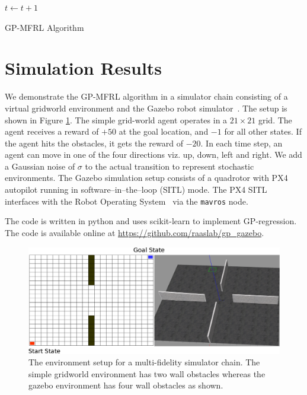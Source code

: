 \documentclass[12pt]{report}
\begin{document}
\begin{algorithm}
{{$t \leftarrow t + 	1$ \;



}}
\caption{GP-MFRL Algorithm}\label{GP-MFRL}
\end{algorithm}



\section{Simulation Results} \label{gp-mfrl-sim}
We demonstrate the GP-MFRL algorithm in a simulator chain consisting of a virtual gridworld environment and the Gazebo robot simulator~\cite{koenig2004design}. The setup is shown in Figure \ref{fig:gp_mfrl_setup}. The simple grid-world agent operates in a $21\times 21$ grid. The agent receives a reward of $+50$ at the goal location, and $-1$ for all other states. If the agent hits the obstacles, it gets the reward of $-20$. In each time step, an agent can move in one of the four directions viz. up, down, left and right. We add a Gaussian noise of $\sigma$ to the actual transition to represent stochastic environments. The Gazebo simulation setup consists of a quadrotor with PX4 autopilot running in software--in--the--loop (SITL) mode. The PX4 SITL interfaces with the Robot Operating System~\cite{quigley2009ros} via the \texttt{mavros} node. 

The code is written in python and uses scikit-learn \cite{scikit-learn} to implement GP-regression. The code is available online at \url{https://github.com/raaslab/gp_gazebo}.

\begin{figure}[htp]
	\centering
	\includegraphics[width=1\columnwidth]{env.eps}
	\caption{The environment setup for a multi-fidelity simulator chain. The simple gridworld environment has two wall obstacles whereas the gazebo environment has four wall obstacles as shown.}
   \label{fig:gp_mfrl_setup}
\end{figure}
\end{document}
